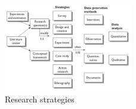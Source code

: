 \documentclass[11pt, a4paper]{article}
\begin{document}
\begin{figure}[h]
    \center
    \includegraphics[width=0.5\textwidth]{research-strategies.png}
    \caption{Research strategies \cite{oates2005researching}}
    \label{fig:research_strategies}
\end{figure}

\printbibliography 
\pagebreak

\end{document}
